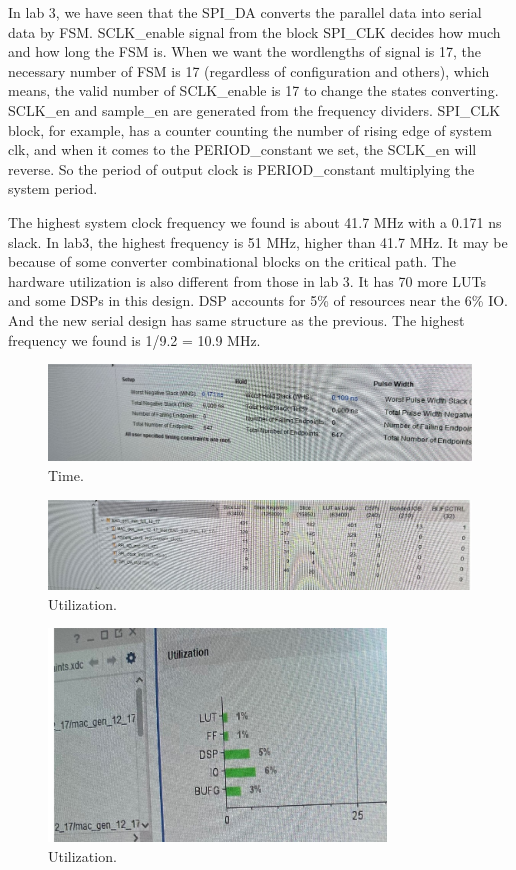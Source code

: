 \documentclass[a4paper]{article}
\begin{document}
In lab 3, we have seen that the SPI\_DA converts the parallel data into serial data by FSM. SCLK\_enable signal from the block SPI\_CLK decides how much and how long the FSM is. When we want the wordlengths of signal is 17, the necessary number of FSM is 17 (regardless of configuration and others), which means, the valid number of SCLK\_enable is 17 to change the states converting. SCLK\_en and sample\_en are generated from the frequency dividers. SPI\_CLK block, for example, has a counter counting the number of rising edge of system clk, and when it comes to the PERIOD\_constant we set, the SCLK\_en will reverse. So the period of output clock is PERIOD\_constant multiplying the system period.


The highest system clock frequency we found is about 41.7 MHz with a 0.171 ns slack. In lab3, the highest frequency is 51 MHz, higher than 41.7 MHz. It may be because of some converter combinational blocks on the critical path. The hardware utilization is also different from those in lab 3. It has 70 more LUTs and some DSPs in this design. DSP accounts for 5\% of resources near the 6\% IO. And the new serial design has same structure as the previous. The highest frequency we found is 1/9.2 = 10.9 MHz.



\begin{figure}[h]
\centering
\includegraphics[width=1\textwidth]{2.jpg}
\caption{\label{fig:data}Time.}
\end{figure}

\begin{figure}[h]
\centering
\includegraphics[width=1\textwidth]{3.jpg}
\caption{\label{fig:data}Utilization.}
\end{figure}


\begin{figure}[h]
\centering
\includegraphics[width=0.8\textwidth]{4.jpg}
\caption{\label{fig:data}Utilization.}
\end{figure}
\end{document}
